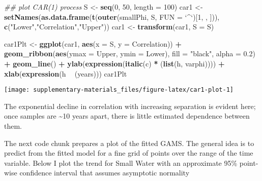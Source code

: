 \documentclass[12pt,]{article}
\newenvironment{Shaded}{\begin{snugshade}}{\end{snugshade}}
\newcommand{\CommentTok}[1]{\textcolor[rgb]{0.56,0.35,0.01}{\textit{#1}}}
\newcommand{\DataTypeTok}[1]{\textcolor[rgb]{0.13,0.29,0.53}{#1}}
\newcommand{\DecValTok}[1]{\textcolor[rgb]{0.00,0.00,0.81}{#1}}
\newcommand{\FloatTok}[1]{\textcolor[rgb]{0.00,0.00,0.81}{#1}}
\newcommand{\KeywordTok}[1]{\textcolor[rgb]{0.13,0.29,0.53}{\textbf{#1}}}
\newcommand{\NormalTok}[1]{#1}
\newcommand{\OperatorTok}[1]{\textcolor[rgb]{0.81,0.36,0.00}{\textbf{#1}}}
\newcommand{\StringTok}[1]{\textcolor[rgb]{0.31,0.60,0.02}{#1}}
\begin{document}
\begin{Shaded}
\begin{Highlighting}[]
\CommentTok{## plot CAR(1) process}
\NormalTok{S <-}\StringTok{ }\KeywordTok{seq}\NormalTok{(}\DecValTok{0}\NormalTok{, }\DecValTok{50}\NormalTok{, }\DataTypeTok{length =} \DecValTok{100}\NormalTok{)}
\NormalTok{car1 <-}\StringTok{ }\KeywordTok{setNames}\NormalTok{(}\KeywordTok{as.data.frame}\NormalTok{(}\KeywordTok{t}\NormalTok{(}\KeywordTok{outer}\NormalTok{(smallPhi, S, }\DataTypeTok{FUN =} \StringTok{`}\DataTypeTok{^}\StringTok{`}\NormalTok{)[}\DecValTok{1}\NormalTok{, , ])),}
                 \KeywordTok{c}\NormalTok{(}\StringTok{"Lower"}\NormalTok{,}\StringTok{"Correlation"}\NormalTok{,}\StringTok{"Upper"}\NormalTok{))}
\NormalTok{car1 <-}\StringTok{ }\KeywordTok{transform}\NormalTok{(car1, }\DataTypeTok{S =}\NormalTok{ S)}

\NormalTok{car1Plt <-}\StringTok{ }\KeywordTok{ggplot}\NormalTok{(car1, }\KeywordTok{aes}\NormalTok{(}\DataTypeTok{x =}\NormalTok{ S, }\DataTypeTok{y =}\NormalTok{ Correlation)) }\OperatorTok{+}
\StringTok{    }\KeywordTok{geom_ribbon}\NormalTok{(}\KeywordTok{aes}\NormalTok{(}\DataTypeTok{ymax =}\NormalTok{ Upper, }\DataTypeTok{ymin =}\NormalTok{ Lower),}
                \DataTypeTok{fill =} \StringTok{"black"}\NormalTok{, }\DataTypeTok{alpha =} \FloatTok{0.2}\NormalTok{) }\OperatorTok{+}
\StringTok{    }\KeywordTok{geom_line}\NormalTok{() }\OperatorTok{+}
\StringTok{    }\KeywordTok{ylab}\NormalTok{(}\KeywordTok{expression}\NormalTok{(}\KeywordTok{italic}\NormalTok{(c) }\OperatorTok{*}\StringTok{ }\NormalTok{(}\KeywordTok{list}\NormalTok{(h, varphi)))) }\OperatorTok{+}
\StringTok{    }\KeywordTok{xlab}\NormalTok{(}\KeywordTok{expression}\NormalTok{(h }\OperatorTok{~}\StringTok{ }\NormalTok{(years)))}
\NormalTok{car1Plt}
\end{Highlighting}
\end{Shaded}

\begin{center}\texttt{[image: supplementary-materials\_files/figure-latex/car1-plot-1]} \end{center}

The exponential decline in correlation with increasing separation is
evident here; once samples are \textasciitilde{}10 years apart, there is
little estimated dependence between them.

The next code chunk prepares a plot of the fitted GAMS. The general idea
is to predict from the fitted model for a fine grid of points over the
range of the time variable. Below I plot the trend for Small Water with
an approximate 95\% point-wise confidence interval that assumes
asymptotic normality
\end{document}
